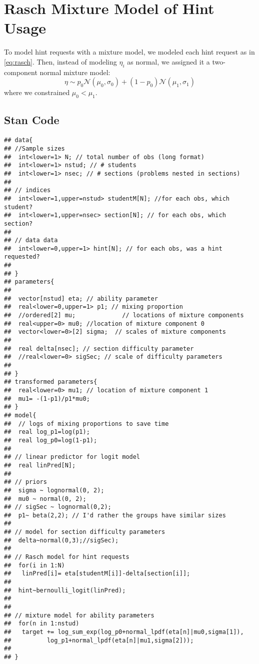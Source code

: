 \documentclass{article}\usepackage[]{graphicx}\usepackage[]{color}
\makeatletter
\newenvironment{kframe}{%
 \def\at@end@of@kframe{}%
 \ifinner\ifhmode%
  \def\at@end@of@kframe{\end{minipage}}%
  \begin{minipage}{\columnwidth}%
 \fi\fi%
 \def\FrameCommand##1{\hskip\@totalleftmargin \hskip-\fboxsep
 \colorbox{shadecolor}{##1}\hskip-\fboxsep
     \hskip-\linewidth \hskip-\@totalleftmargin \hskip\columnwidth}%
 \MakeFramed {\advance\hsize-\width
   \@totalleftmargin\z@ \linewidth\hsize
   \@setminipage}}%
 {\par\unskip\endMakeFramed%
 \at@end@of@kframe}
\newenvironment{knitrout}{}{} %
\renewenvironment{knitrout}{\begin{singlespace}}{\end{singlespace}}
\makeatother
\begin{document}



\newpage
\appendix

\section{Rasch Mixture Model of Hint Usage}

To model hint requests with a mixture model, we modeled each hint
request as in \eqref{eq:rasch}.
Then, instead of modeling $\eta_i$ as normal, we assigned it a
two-component normal mixture model:
\begin{equation*}
\eta\sim
p_0\mathcal{N}(\mu_0,\sigma_0)+(1-p_0)\mathcal{N}(\mu_1,\sigma_1)
\end{equation*}
where we constrained $\mu_0<\mu_1$.

\subsection{Stan Code}
\begin{knitrout}
\color{fgcolor}\begin{kframe}
\begin{verbatim}
## data{
## //Sample sizes
##  int<lower=1> N; // total number of obs (long format)
##  int<lower=1> nstud; // # students
##  int<lower=1> nsec; // # sections (problems nested in sections)
## 
## // indices
##  int<lower=1,upper=nstud> studentM[N]; //for each obs, which student?
##  int<lower=1,upper=nsec> section[N]; // for each obs, which section?
## 
## // data data
##  int<lower=0,upper=1> hint[N]; // for each obs, was a hint requested?
## 
## }
## parameters{
## 
##  vector[nstud] eta; // ability parameter
##  real<lower=0,upper=1> p1; // mixing proportion
##  //ordered[2] mu;             // locations of mixture components
##  real<upper=0> mu0; //location of mixture component 0
##  vector<lower=0>[2] sigma;  // scales of mixture components
## 
##  real delta[nsec]; // section difficulty parameter
##  //real<lower=0> sigSec; // scale of difficulty parameters
## 
## }
## transformed parameters{
##  real<lower=0> mu1; // location of mixture component 1
##  mu1= -(1-p1)/p1*mu0;
## }
## model{
##  // logs of mixing proportions to save time
##  real log_p1=log(p1);
##  real log_p0=log(1-p1);
## 
## // linear predictor for logit model
##  real linPred[N];
## 
## // priors
##  sigma ~ lognormal(0, 2);
##  mu0 ~ normal(0, 2);
## // sigSec ~ lognormal(0,2);
##  p1~ beta(2,2); // I'd rather the groups have similar sizes
## 
## // model for section difficulty parameters
##  delta~normal(0,3);//sigSec);
## 
## // Rasch model for hint requests
##  for(i in 1:N)
##   linPred[i]= eta[studentM[i]]-delta[section[i]];
## 
##  hint~bernoulli_logit(linPred);
## 
## 
## // mixture model for ability parameters
##  for(n in 1:nstud)
##   target += log_sum_exp(log_p0+normal_lpdf(eta[n]|mu0,sigma[1]),
## 			log_p1+normal_lpdf(eta[n]|mu1,sigma[2]));
## 
## }
\end{verbatim}
\end{kframe}
\end{knitrout}
\end{document}
